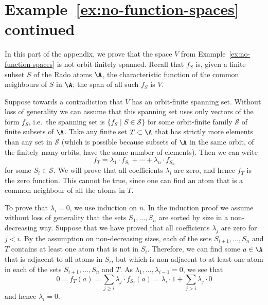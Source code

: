 \section{Example~\ref{ex:no-function-spaces} continued}\label{sec:appendix-no-function-spaces}
In this part of the appendix, we prove that the space $V$ from Example~\ref{ex:no-function-spaces} is not orbit-finitely spanned.
Recall that $f_S$ is, given a finite subset $S$ of the Rado atoms $\A$, the characteristic function of the common neighbours of $S$ in $\A$;
the span of all such $f_S$ is $V$.

Suppose towards a contradiction that $V$ has an orbit-finite spanning set. 
Without loss of generality we can assume that this spanning set uses only vectors of the form $f_S$, 
i.e.~the spanning set is $\{ f_S \mid S \in \mathscr{S} \}$ for some orbit-finite family $\mathscr{S}$ of finite subsets of $\A$.
Take any finite set $T \subset \A$ that has strictly more elements than any set in $\mathscr{S}$ 
(which is possible because subsets of $\A$ in the same orbit, of the finitely many orbits, have the same number of elements). 
Then we can write
\[
    f_T = \lambda_1 \cdot f_{S_1} + \cdots + \lambda_n \cdot f_{S_n}
\]
for some $S_i \in \mathscr{S}$.  
We will prove that all coefficients $\lambda_i$ are zero, and hence $f_T$ is the zero function. 
This cannot be true, since one can find an atom that is a common neighbour of all the atoms in $T$.

To prove that $\lambda_i = 0$, we use induction on $n$. 
In the induction proof we assume without loss of generality that the sets $S_1,\ldots,S_n$ are sorted by size in a non-decreasing way. 
Suppose that we have proved that all coefficients $\lambda_j$ are zero for $j < i$. 
By the assumption on non-decreasing sizes, each of the sets $S_{i+1},\ldots,S_{n}$ and $T$ contains at least one atom that is not in $S_i$. 
Therefore, we can find some $a \in \A$ that is adjacent to all atoms in $S_i$, 
but which is non-adjacent to at least one atom in each of the sets $S_{i+1},\ldots,S_{n}$ and $T$. 
As $\lambda_1, \dots, \lambda_{i-1} = 0$, we see that
\[
    0 = f_T(a) = \sum_{j \geq i} \lambda_j \cdot f_{S_j}(a) = \lambda_i \cdot 1 + \sum_{j > i} \lambda_j \cdot 0
\]
and hence $\lambda_i=0$.
